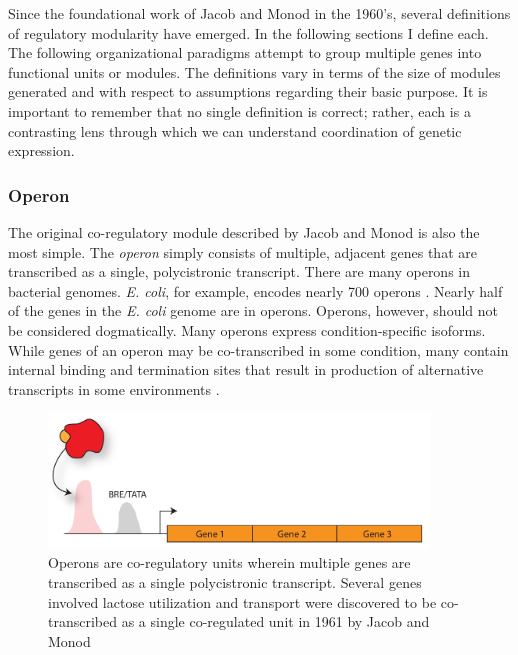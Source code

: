 Since the foundational work of Jacob and Monod in the 1960's, several definitions of regulatory modularity have emerged. In the following sections I define each. The following organizational paradigms attempt to group multiple genes into functional units or modules. The definitions vary in terms of the size of modules generated and with respect to assumptions regarding their basic purpose. It is important to remember that no single definition is correct; rather, each is a contrasting lens through which we can understand coordination of genetic expression.   

\subsubsection{Operon}

The original co-regulatory module described by Jacob and Monod \cite{jacob_genetic_1961} is also the most simple. The \textit{operon} simply consists of multiple, adjacent genes that are transcribed as a single, polycistronic transcript. There are many operons in bacterial genomes. \textit{E. coli}, for example, encodes nearly 700 operons \cite{salgado_operons_2000}. Nearly half of the genes in the \textit{E. coli} genome are in operons.  Operons, however, should not be considered dogmatically. Many operons express condition-specific isoforms. While genes of an operon may be co-transcribed in some condition, many contain internal binding and termination sites that result in production of alternative transcripts in some environments \cite{koide_prevalence_2009}. 

\begin{figure}[h!]
    \centering
    \includegraphics[width=0.9\textwidth]{figures/operon}
 	\caption[Operons: multiple genes transcribed as a single polycistronic transcript]{
 	Operons are co-regulatory units wherein multiple genes are transcribed as a single polycistronic transcript. Several genes involved lactose utilization and transport were discovered to be co-transcribed as a single co-regulated unit in 1961 by Jacob and Monod \cite{jacob_genetic_1961}
}
    \label{fig:chap1:operon}
\end{figure}


